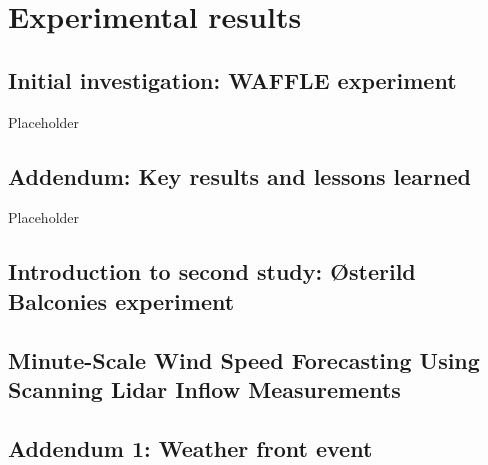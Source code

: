\chapter{Experimental results}
\label{sec:results}

\clearpage
\section{Initial investigation: WAFFLE experiment}
\label{sec:waffle}

Placeholder

\clearpage
\section{Addendum: Key results and lessons learned}
\label{sec:waffle_addendum}

Placeholder

\clearpage
\section{Introduction to second study: \newline 
{\O}sterild Balconies experiment}
\label{sec:balcony_intro}

\clearpage
\section{Minute-Scale Wind Speed Forecasting Using Scanning Lidar Inflow Measurements}
\label{sec:balcony_paper}



\clearpage
\section{Addendum 1: Weather front event}
\label{sec:balcony_addendum1}


